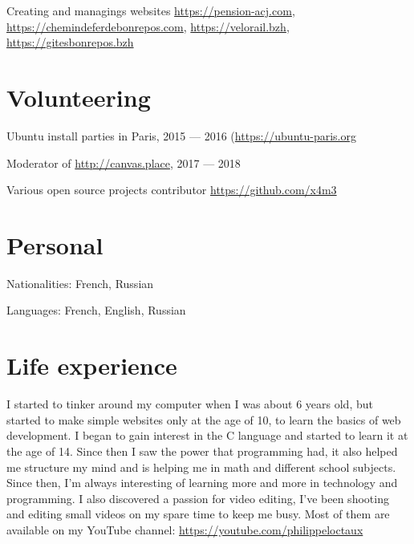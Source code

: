 \documentclass[a4paper]{article}
\begin{document}
Creating and managings websites \url{https://pension-acj.com}, \url{https://chemindeferdebonrepos.com}, \url{https://velorail.bzh}, \url{https://gitesbonrepos.bzh}

\section*{Volunteering}

Ubuntu install parties in Paris, 2015 — 2016 (\url{https://ubuntu-paris.org}

Moderator of \url{http://canvas.place}, 2017 — 2018

Various open source projects contributor \url{https://github.com/x4m3}

\section*{Personal}

Nationalities: French, Russian

Languages: French, English, Russian

\section*{Life experience}

I started to tinker around my computer when I was about 6 years old, but started to make simple websites only at the age of 10, to learn the basics of web development. I began to gain interest in the C language and started to learn it at the age of 14. Since then I saw the power that programming had, it also helped me structure my mind and is helping me in math and different school subjects. Since then, I'm always interesting of learning more and more in technology and programming. I also discovered a passion for video editing, I’ve been shooting and editing small videos on my spare time to keep me busy. Most of them are available on my YouTube channel: \url{https://youtube.com/philippeloctaux}
\end{document}
